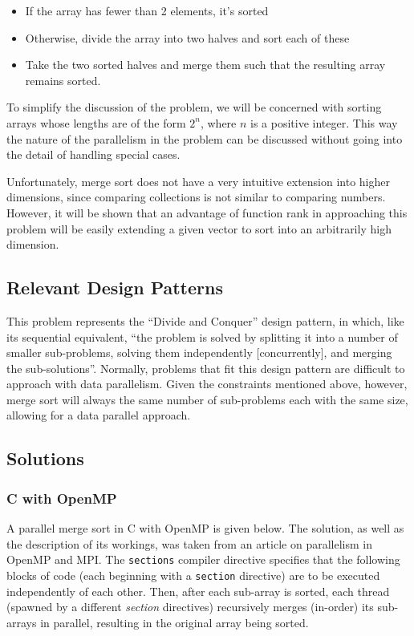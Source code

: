 \begin{itemize}
	\item If the array has fewer than 2 elements, it's sorted
	\item Otherwise, divide the array into two halves and sort each of these
	\item Take the two sorted halves and merge them such that the resulting array remains sorted.
\end{itemize}

To simplify the discussion of the problem, 
we will be concerned with sorting arrays 
whose lengths are of the form $2^n$, where $n$ is a positive integer.
This way the nature of the parallelism in the problem can be discussed 
without going into the detail of handling special cases.

Unfortunately, merge sort does not have a very intuitive extension into higher dimensions, 
since comparing collections is not similar to comparing numbers.
However, it will be shown that an advantage of function rank in approaching this problem
will be easily extending a given vector to sort into an arbitrarily high dimension.

\subsection{Relevant Design Patterns}
This problem represents the ``Divide and Conquer'' design pattern,
in which, like its sequential equivalent,
``the problem is solved by splitting it into a number of smaller sub-problems, 
solving them independently [concurrently], and merging the sub-solutions''\cite{mass}.
Normally, problems that fit this design pattern are difficult to approach with data parallelism.
Given the constraints mentioned above, however,
merge sort will always the same number of sub-problems each with the same size, 
allowing for a data parallel approach.

\subsection{Solutions}
\subsubsection{C with OpenMP}
A parallel merge sort in C with OpenMP is given below.
The solution, as well as the description of its workings, 
was taken from an article on parallelism in OpenMP and MPI\cite{mergeomp}.
The \texttt{sections} compiler directive
specifies that the following blocks of code (each beginning with a \texttt{section} directive) 
are to be executed independently of each other\cite{openmp}. 
Then, after each sub-array is sorted, each thread (spawned by a different \textit{section} directives) 
recursively merges (in-order) its sub-arrays in parallel, resulting in the original array being sorted.

